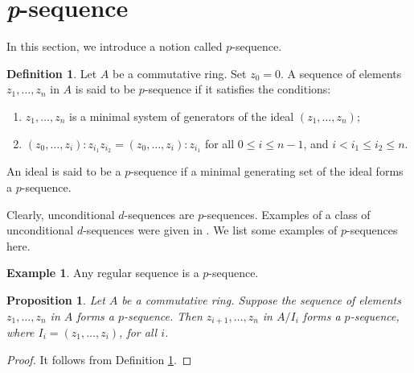 \documentclass[11pt,a4paper,reqno]{amsart}
\newtheorem{proposition}[theorem]{Proposition}
\theoremstyle{definition}
\newtheorem{definition}[theorem]{Definition}
\newtheorem{example}[theorem]{Example}
\begin{document}
\section{\textit{p}-sequence} \label{sec.p-seq}

In this section, we introduce a notion called $p$-sequence. 

\begin{definition} \label{p-sequence}
    Let $A$ be a commutative ring. Set $z_0=0$.  A sequence of elements $z_1,\ldots,z_n$ in $A$ is said to be $p$-sequence if it satisfies the conditions: 
\begin{enumerate}
    \item \label{p-sequ.1} $z_1,\ldots,z_n$ is a minimal system of generators of the ideal $(z_1,\ldots,z_n)$;
    \item \label{p-sequ.2} $( z_0,\ldots,z_i ) : z_{i_1}z_{i_2} = ( z_0,\ldots,z_i ) : z_{i_1}$ for all $0 \leq i \leq n-1$, and $i < i_1 \leq i_2 \leq n$.

\end{enumerate} 

An ideal is said to be a $p$-sequence if a minimal generating set of the ideal forms a $p$-sequence.
\end{definition}

Clearly, unconditional $d$-sequences are $ p$-sequences. Examples of a class of unconditional $d$-sequences were given in \cite{H1982}. We list some examples of $p$-sequences here.

\begin{example}
    Any regular sequence is a $p$-sequence. 
\end{example}

\begin{proposition} \label{prop.p-subseq}
    Let $A$ be a commutative ring. Suppose the sequence of elements $z_1,\ldots,z_n$ in $A$ forms a $p$-sequence. Then $z_{i+1},\ldots,z_n$ in $A/I_i$ forms a $p$-sequence, where $I_i=(z_1,\ldots,z_{i})$, for all $i$.
\end{proposition}
\begin{proof}
    It follows from Definition \ref{p-sequence}.
\end{proof}
 
\end{document}
